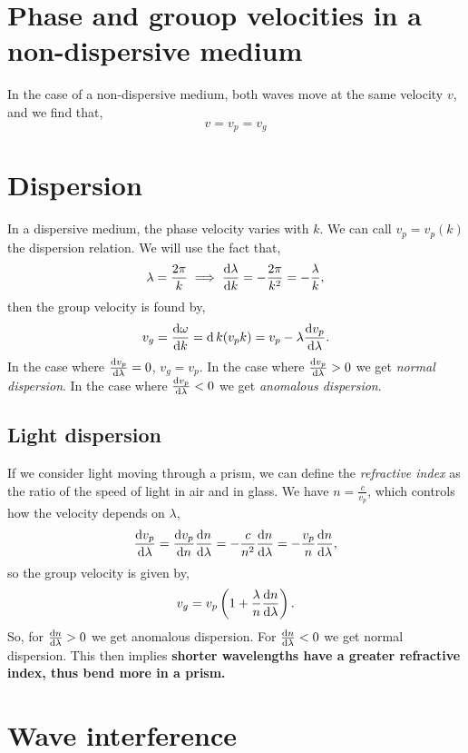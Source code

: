 \documentclass{book}
\begin{document}
\section{Phase and grouop velocities in a non-dispersive medium}
In the case of a non-dispersive medium, both waves move at the same velocity $v$, and we find that,
\begin{equation}
	v = v_p = v_g
\end{equation}
\section{Dispersion}
In a dispersive medium, the phase velocity varies with $k$. We can call $v_p = v_p(k)$ the dispersion relation. We will use the fact that,
\begin{equation}
	\lambda = \frac{2\pi}{k} \implies \dv{\lambda}{k} = -\frac{2\pi}{k^2} = -\frac{\lambda}{k},
\end{equation}
then the group velocity is found by,
\begin{equation}
	v_g = \dv{\omega}{k} = \dd{}{k}(v_pk) = v_p -\lambda\dv{v_p}{\lambda}.
\end{equation}
In the case where $\dv{v_p}{\lambda} = 0$, $v_g = v_p$. In the case where $\dv{v_p}{\lambda} > 0$ we get \textit{normal dispersion}. In the case where $\dv{v_p}{\lambda} < 0$ we get \textit{anomalous dispersion}.
\subsection{Light dispersion}
If we consider light moving through a prism, we can define the \textit{refractive index} as the ratio of the speed of light in air and in glass. We have $n = \frac{c}{v_p}$, which controls how the velocity depends on $\lambda$,
\begin{equation}
	\dv{v_p}{\lambda} = \dv{v_p}{n}\dv{n}{\lambda} = -\frac{c}{n^2}\dv{n}{\lambda} = -\frac{v_p}{n}\dv{n}{\lambda},
\end{equation} 
so the group velocity is given by,
\begin{equation}
	v_g = v_p \left(1 + \frac{\lambda}{n}\dv{n}{\lambda}\right).
\end{equation}
So, for $\dv{n}{\lambda} > 0$ we get anomalous dispersion. For $\dv{n}{\lambda} < 0$ we get normal dispersion. This then implies \textbf{shorter wavelengths have a greater refractive index, thus bend more in a prism.}
\section{Wave interference}
\end{document}
